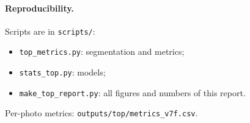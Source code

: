 \documentclass[11pt,a4paper]{article}
\begin{document}
\paragraph{Reproducibility.} Scripts are in \texttt{scripts/}:
\begin{itemize}\setlength\itemsep{0pt}
\item \texttt{top\_metrics.py}: segmentation and metrics;
\item \texttt{stats\_top.py}: models;
\item \texttt{make\_top\_report.py}: all figures and numbers of this report.
\end{itemize}
Per-photo metrics: \texttt{outputs/top/metrics\_v7f.csv}.
\end{document}

